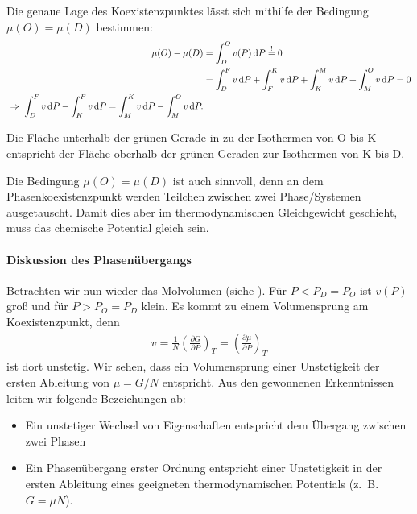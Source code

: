 Die genaue Lage des Koexistenzpunktes lässt sich mithilfe der Bedingung $\mu(O)=\mu(D)$ bestimmen:
\begin{align*}
    \mu(O)-\mu(D) & = \int_D^Ov(P)\diff P \overset{!}{=}0                                       \\
                  & = \int_D^F v\diff P+\int_F^K v\diff P+\int_K^M v\diff P+\int_M^O v\diff P=0 \\
    \implication \int_D^F v\diff P-\int_K^F v\diff P=\int_M^K v\diff P-\int_M^O v\diff P.
\end{align*}
\begin{formal}
    Die Fläche unterhalb der grünen Gerade in  zu der Isothermen von O bis K entspricht der Fläche oberhalb der grünen Geraden zur Isothermen von K bis D. 
\end{formal}



Die Bedingung $\mu(O)=\mu(D)$ ist auch sinnvoll, denn an dem Phasenkoexistenzpunkt werden Teilchen zwischen zwei Phase/Systemen ausgetauscht. Damit dies aber im thermodynamischen Gleichgewicht geschieht, muss das chemische Potential gleich sein.


\paragraph*{Diskussion des Phasenübergangs}

Betrachten wir nun wieder das Molvolumen (siehe ). Für $P<P_D=P_O$ ist $v(P)$ groß und für $P>P_O=P_D$ klein. Es kommt zu einem Volumensprung am Koexistenzpunkt, denn
\begin{align*}
    v=\frac{1}{N}\left( \frac{\partial G}{\partial P} \right)_T =\left( \frac{\partial \mu}{\partial P} \right)_T
\end{align*}
ist dort unstetig. Wir sehen, dass ein Volumensprung einer Unstetigkeit der ersten Ableitung von $\mu=G/N$ entspricht. Aus den gewonnenen Erkenntnissen leiten wir folgende Bezeichungen ab:
\begin{itemize}
    \item Ein unstetiger Wechsel von Eigenschaften entspricht dem Übergang zwischen zwei Phasen
    \item Ein Phasenübergang erster Ordnung entspricht einer Unstetigkeit in der ersten Ableitung eines geeigneten thermodynamischen Potentials (z.~B. $G=\mu N$).
\end{itemize}

